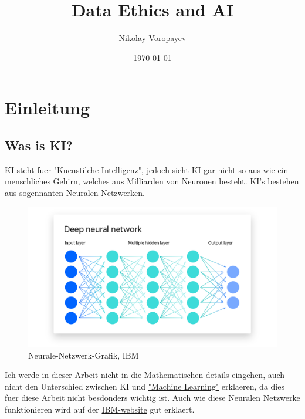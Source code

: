 \documentclass{report}
\title{Data Ethics and AI}
\author{Nikolay Voropayev}
\date{\today}
\begin{document}
\maketitle


\tableofcontents

\chapter{Einleitung}
\section{Was is KI?}
KI steht fuer "Kuenstilche Intelligenz", jedoch sieht KI gar nicht so aus wie ein menschliches Gehirn, welches aus Milliarden von Neuronen besteht.
KI's bestehen aus sogennanten \hyperlink{https://www.ibm.com/topics/artificial-intelligence}{Neuralen Netzwerken}.
\begin{figure}[h]
    \centering 
    \includegraphics[width=1\textwidth]{NN-ibm.png} 
    \caption{Neurale-Netzwerk-Grafik, IBM}
    \label{fig:meme}
\end{figure}
\newline
Ich werde in dieser Arbeit nicht in die Mathematischen details eingehen, auch nicht den Unterschied zwischen KI und \hyperlink{https://www.ibm.com/topics/machine-learning}{"Machine Learning"} erklaeren, da dies fuer diese Arbeit nicht besdonders wichtig ist. Auch wie diese Neuralen Netzwerke funktionieren 
wird auf der \hyperlink{https://www.ibm.com/topics/neural-networks}{IBM-website} gut erklaert.
\end{document}

